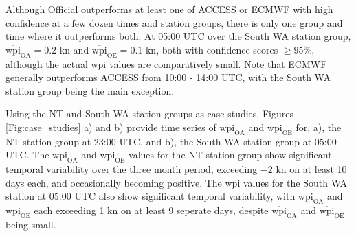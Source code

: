 \documentclass[alpha-refs]{wiley-article}
\begin{document}
Although Official outperforms at least one of ACCESS or ECMWF with high confidence at a few dozen times and station groups, there is only one group and time where it outperforms both. At 05:00 UTC over the South WA station group, $\overline{\text{wpi}}_\text{OA} = 0.2$ kn and $\overline{\text{wpi}}_\text{OE} = 0.1$ kn, both with confidence scores $\geq 95\%$, although the actual $\overline{\text{wpi}}$ values are comparatively small. Note that ECMWF generally outperforms ACCESS from 10:00 - 14:00 UTC, with the South WA station group being the main exception.    

Using the NT and South WA station groups as case studies, Figures \ref{Fig:case_studies} a) and b) provide time series of $\text{wpi}_\text{OA}$ and $\text{wpi}_\text{OE}$ for, a), the NT station group at 23:00 UTC, and b), the South WA station group at 05:00 UTC. The $\text{wpi}_\text{OA}$ and $\text{wpi}_\text{OE}$ values for the NT station group show significant temporal variability over the three month period, exceeding $-2$ kn on at least 10 days each, and occasionally becoming positive. The $\text{wpi}$ values for the South WA station at 05:00 UTC also show significant temporal variability, with $\text{wpi}_\text{OA}$ and $\text{wpi}_\text{OE}$ each exceeding 1 kn on at least 9 seperate days, despite $\overline{\text{wpi}}_\text{OA}$ and $\overline{\text{wpi}}_\text{OE}$ being small. 
\end{document}
